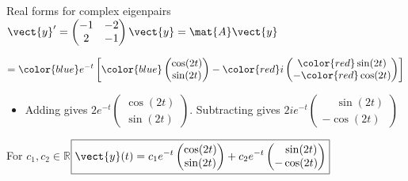\begin{frame}{Real forms for complex eigenpairs \qquad $\vect{y}'=\begin{pmatrix}-1&-2\\2&-1\end{pmatrix}\vect{y}=\mat{A}\vect{y}$}
\begin{itemize}
\[\begin{aligned}
        ={\color{blue}e^{-t}}\left[{\color{blue}\begin{pmatrix}\cos(2t)\\\sin(2t)\end{pmatrix}}-{\color{red}i}\begin{pmatrix}{\color{red}\sin(2t)}\\-{\color{red}\cos(2t)}\end{pmatrix}\right]
      \end{aligned}
    \]
    \begin{itemize}
\setlength{\itemsep}{2pt}
    \item Adding gives
    $\boxed{2 e^{-t}\begin{pmatrix}\cos(2t)\\\sin(2t)\end{pmatrix}}$.
    Subtracting gives
    $\boxed{2 i e^{-t}
    \begin{pmatrix}
    	\phantom{+}\sin(2t) \\
    	-\cos(2t)
    \end{pmatrix}}
    $
    \end{itemize}
\end{itemize}
For $c_1,c_2\in\mathbb{R}$\quad$\displaystyle \boxed{\vect{y}(t)=c_1e^{-t}\begin{pmatrix}\cos(2t)\\\sin(2t)\end{pmatrix}
    +c_2e^{-t}\begin{pmatrix}\phantom{+}\sin(2t)\\-\cos(2t)\end{pmatrix}}$
\end{frame}

\endgroup
